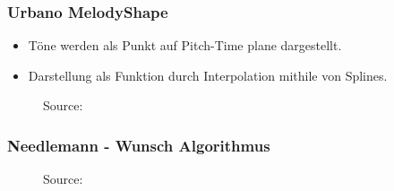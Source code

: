 \documentclass{beamer}
\begin{document}
	\begin{frame}
        \frametitle{Urbano MelodyShape}
        \begin{minipage}{0.45\textwidth}
            \begin{itemize}
             \item Töne werden als Punkt  auf Pitch-Time plane dargestellt.
             \item Darstellung als Funktion durch Interpolation mithile von Splines.
            \end{itemize}
        \end{minipage}
        \begin{minipage}{0.45\textwidth}
        \begin{figure}[h!]
             \caption{Source: \cite{five_point_two}}
        \end{figure}
        \end{minipage}
	\end{frame}
	
    \begin{frame}
        \frametitle{Needlemann - Wunsch Algorithmus}
      \begin{figure}[h!]
         \caption{Source: \cite{wiki_nee_wu}}
        \end{figure}
	\end{frame}
	
\end{document}

